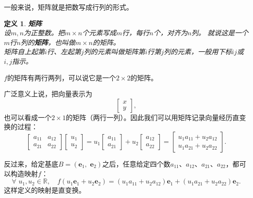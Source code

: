 \documentclass[12pt,UTF8]{ctexbook}
\newtheorem{df}{定义}[section]
\begin{document}
一般来说，矩阵就是把数写成行列的形式。
\begin{df}{\textbf{矩阵}}
    \mbox{}\\
    设$m,n$为正整数。把$m \times n$个元素写成$m$行，每行$n$个，对齐为$n$列。
    就说这是一个$m$行$n$列的\textbf{矩阵}，也叫做$m \times n$的矩阵。\\
    矩阵自上起第$i$行、左起第$j$列的元素叫做矩阵第$i$行第$j$列的元素，一般用下标$ij$或$i,j$指示。
\end{df}

$f$的矩阵有两行两列，可以说它是一个$2\times 2$的矩阵。

广泛意义上说，把向量表示为
$$ \begin{bmatrix}
    x\\ y
\end{bmatrix},$$
也可以看成一个$2\times 1$的矩阵（两行一列）。因此我们可以用矩阵记录向量经历直变换的过程：
$$ \begin{bmatrix}
    a_{11} & a_{12} \\ a_{21} & a_{22}
\end{bmatrix}\begin{bmatrix}
    u_1\\ u_2
\end{bmatrix} = u_1\begin{bmatrix}
    a_{11}\\ a_{21}
\end{bmatrix} + u_2 \begin{bmatrix}
    a_{12}\\ a_{22}
\end{bmatrix} = \begin{bmatrix}
    u_1a_{11} + u_2a_{12}\\ u_1a_{21} + u_2a_{22} 
\end{bmatrix}.$$

反过来，给定基底$B = (\mathbf{e}_1, \,\,\mathbf{e}_2)$之后，任意给定四个数$a_{11}$、$a_{12}$、$a_{21}$、$a_{22}$，都可以构造映射$f$：
$$ \forall \,\, u_1, u_2 \in \mathbb{R}, \quad  f(u_1\mathbf{e}_1 + u_2\mathbf{e}_2) = (u_1a_{11} + u_2a_{12}) \mathbf{e}_1 + (u_1a_{21} + u_2a_{22}) \mathbf{e}_2.$$
这样定义的映射是直变换。
\end{document}
